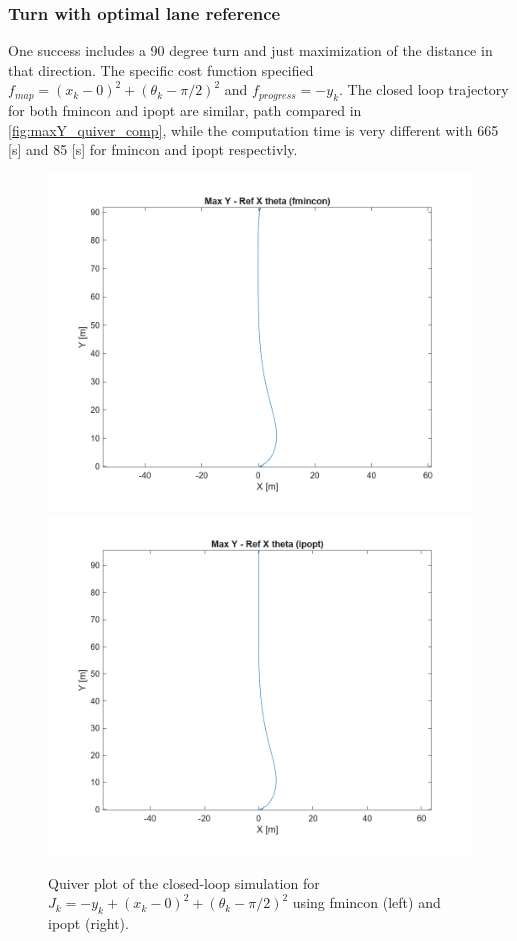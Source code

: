 \documentclass[]{IEEEtran}
\begin{document}
\subsubsection{Turn with optimal lane reference}
One success includes a 90 degree turn and just maximization of the distance in that direction. 
The specific cost function specified $f_{map} = (x_k - 0)^2 + (\theta_k - \pi/2)^2$ and $f_{progress} = -y_k$.
The closed loop trajectory for both fmincon and ipopt are similar, path compared in \autoref{fig:maxY_quiver_comp}, while the computation time is very different with 665 [s] and 85 [s] for fmincon and ipopt respectivly.
\begin{figure}[h]
    \centering
    \includegraphics[width = 0.49\columnwidth]{figs/Max_Y_-_Ref_X_theta_(fmincon)_quiver.png}
    \includegraphics[width = 0.49\columnwidth]{figs/Max_Y_-_Ref_X_theta_(ipopt)_quiver.png}
    \caption{Quiver plot of the closed-loop simulation for $J_k = -y_k + (x_k - 0)^2 + (\theta_k - \pi/2)^2$ using fmincon (left) and ipopt (right).}\label{fig:maxY_quiver_comp}
\end{figure}
\end{document}
